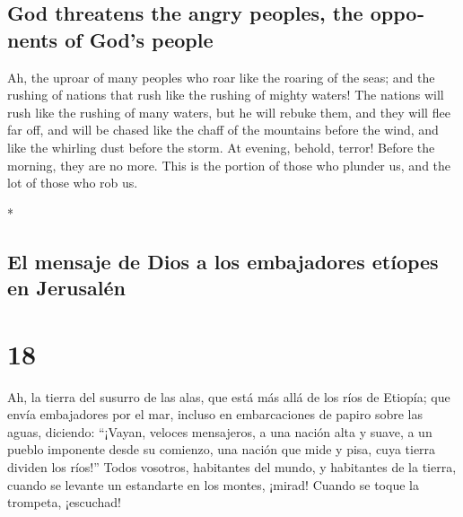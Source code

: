 \begin{paracol}{2}
\begin{otherlanguage}{english}
\hypertarget{god-threatens-the-angry-peoples-the-opponents-of-gods-people}{%
\subsection{God threatens the angry peoples, the opponents of God's
people}\label{god-threatens-the-angry-peoples-the-opponents-of-gods-people}}

 Ah, the uproar of many peoples who roar like the roaring
of the seas; and the rushing of nations that rush like the rushing of
mighty waters!  The nations will rush like the rushing of
many waters, but he will rebuke them, and they will flee far off, and
will be chased like the chaff of the mountains before the wind, and like
the whirling dust before the storm.  At evening, behold,
terror! Before the morning, they are no more. This is the portion of
those who plunder us, and the lot of those who rob us.

\end{otherlanguage}

\switchcolumn[0]*

\hypertarget{el-mensaje-de-dios-a-los-embajadores-etuxedopes-en-jerusaluxe9n}{%
\subsection{El mensaje de Dios a los embajadores etíopes en
Jerusalén}\label{el-mensaje-de-dios-a-los-embajadores-etuxedopes-en-jerusaluxe9n}}

\hypertarget{section-34}{%
\section{18}\label{section-34}}

 Ah, la tierra del susurro de las alas, que está más allá
de los ríos de Etiopía;  que envía embajadores por el mar,
incluso en embarcaciones de papiro sobre las aguas, diciendo: ``¡Vayan,
veloces mensajeros, a una nación alta y suave, a un pueblo imponente
desde su comienzo, una nación que mide y pisa, cuya tierra dividen los
ríos!''  Todos vosotros, habitantes del mundo, y
habitantes de la tierra, cuando se levante un estandarte en los montes,
¡mirad! Cuando se toque la trompeta, ¡escuchad!


\end{paracol}
